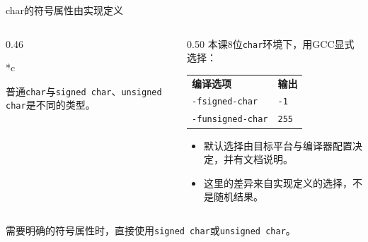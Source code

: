 \begin{frame}{char的符号属性由实现定义}
    \begin{columns}[T]
        \begin{column}{0.46\textwidth}
            \begin{Code}*{c}
                
            \end{Code}
            \small 普通\texttt{char}与\texttt{signed char}、\texttt{unsigned char}是不同的类型。
        \end{column}
        \begin{column}{0.50\textwidth}
            \small 本课8位\texttt{char}环境下，用GCC显式选择：
            \begin{center}
                \renewcommand{\arraystretch}{1.4}
                \begin{tabular}{ll}
                    \textbf{编译选项} & \textbf{输出} \\
                    \texttt{-fsigned-char} & \texttt{-1} \\
                    \texttt{-funsigned-char} & \texttt{255}
                \end{tabular}
            \end{center}
            \begin{itemize}
                \item 默认选择由目标平台与编译器配置决定，并有文档说明。
                \item 这里的差异来自\alert{实现定义的选择}，不是随机结果。
            \end{itemize}
        \end{column}
    \end{columns}
    \medskip
    \small 需要明确的符号属性时，直接使用\texttt{signed char}或\texttt{unsigned char}。
\end{frame}

